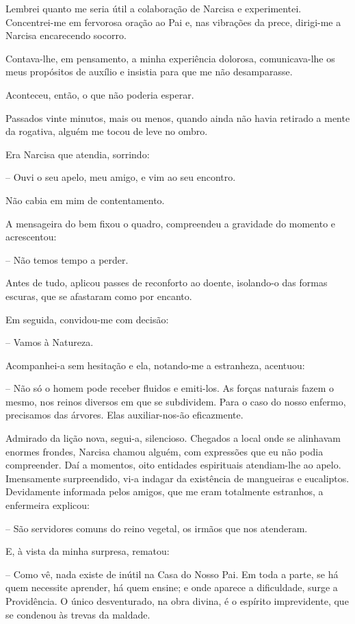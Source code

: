 \documentclass[portuguese,12pt,a4paper]{scrbook}
\begin{document}
	Lembrei quanto me seria útil a colaboração de Narcisa e experimentei. Concentrei-me em fervorosa oração ao Pai e, nas vibrações da prece, dirigi-me a Narcisa encarecendo socorro.
	
	Contava-lhe, em pensamento, a minha experiência dolorosa, comunicava-lhe os meus propósitos de auxílio e insistia para que me não desamparasse.
	
	Aconteceu, então, o que não poderia esperar.
	
	Passados vinte minutos, mais ou menos, quando ainda não havia retirado a mente da rogativa, alguém me tocou de leve no ombro.
	
	Era Narcisa que atendia, sorrindo:
	
	– Ouvi o seu apelo, meu amigo, e vim ao seu encontro.
	
	Não cabia em mim de contentamento.
	
	A mensageira do bem fixou o quadro, compreendeu a gravidade do momento e acrescentou:
	
	– Não temos tempo a perder.
	
	Antes de tudo, aplicou passes de reconforto ao doente, isolando-o das formas escuras, que se afastaram como por encanto.
	
	Em seguida, convidou-me com decisão:
	
	– Vamos à Natureza.
	
	Acompanhei-a sem hesitação e ela, notando-me a estranheza, acentuou:
	
	– Não só o homem pode receber fluidos e emiti-los. As forças naturais fazem o mesmo, nos reinos diversos em que se subdividem. Para o caso do nosso enfermo, precisamos das árvores. Elas auxiliar-nos-ão eficazmente.
	
	
	Admirado da lição nova, segui-a, silencioso. Chegados a local onde se alinhavam enormes frondes, Narcisa chamou alguém, com expressões que eu não podia compreender. Daí a momentos, oito entidades espirituais atendiam-lhe ao apelo. Imensamente surpreendido, vi-a indagar da existência de mangueiras e eucaliptos. Devidamente informada pelos amigos, que me eram totalmente estranhos, a enfermeira explicou:
	
	– São servidores comuns do reino vegetal, os irmãos que nos atenderam.
	
	E, à vista da minha surpresa, rematou:
	
	– Como vê, nada existe de inútil na Casa do Nosso Pai. Em toda a parte, se há quem necessite aprender, há quem ensine; e onde aparece a dificuldade, surge a Providência. O único desventurado, na obra divina, é o espírito imprevidente, que se condenou às trevas da maldade.
	
\end{document}
